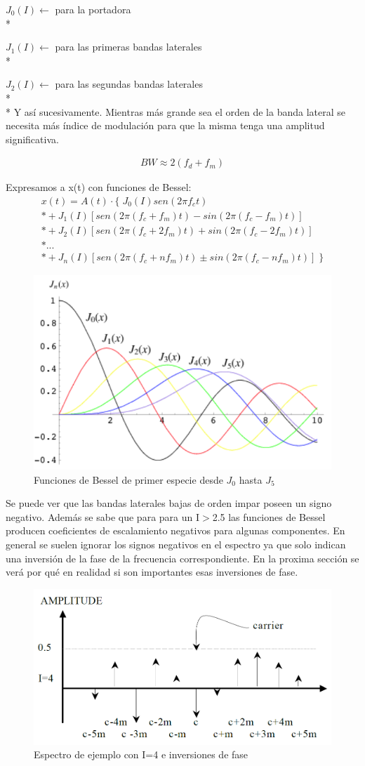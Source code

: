 \documentclass[assd_tp2_main.tex]{subfiles}
\begin{document}
$J_{0}(I)\longleftarrow$  para la portadora \\*

$J_{1}(I)\longleftarrow$  para las primeras bandas laterales \\*

$J_{2}(I)\longleftarrow$  para las segundas bandas laterales \\*
\\*
Y así sucesivamente.
Mientras más grande sea el orden de la banda lateral se necesita más índice de modulación para que la misma tenga una amplitud significativa.

\begin{eqnarray*}
\displaystyle BW \approx 2(f_d+f_m)
\end{eqnarray*}

Expresamos a x(t) con funciones de Bessel:
\begin{eqnarray*}
\textstyle x(t)=A(t)\cdot \{ \; J_{0}(I)sen(2\pi f_c t) \\*
				+J_1(I)[sen(2\pi(f_c+f_m)t) - sin(2\pi(f_c-f_m)t)] \\*
				+J_2(I)[sen(2\pi(f_c+2f_m)t) + sin(2\pi(f_c-2f_m)t)] \\*
				... \\*
				+J_n(I)[sen(2\pi(f_c+n f_m)t) \pm sin(2\pi(f_c-n f_m)t)] \; \}
\end{eqnarray*}

\begin{figure}[H]
\centering
\includegraphics[width=0.4\linewidth]{graficos/EJ4/Bessel.png}
\caption{Funciones de Bessel de primer especie desde $J_0$ hasta $J_5$ }
\label{fig:Bessel}
\end{figure}

Se puede ver que las bandas laterales bajas de orden impar poseen un signo negativo. Además se sabe que para para un I$>$2.5
las funciones de Bessel producen coeficientes de escalamiento negativos para algunas componentes.
En general se suelen ignorar los signos negativos en el espectro ya que solo indican una inversión de la fase de la frecuencia correspondiente. En la proxima sección se verá por qué en realidad si son importantes esas inversiones de fase.
\begin{figure}[H]
\centering
\includegraphics[width=0.4\linewidth]{graficos/EJ4/signos.png}
\caption{Espectro de ejemplo con I=4 e inversiones de fase}
\label{fig:signos}
\end{figure}
\end{document}
